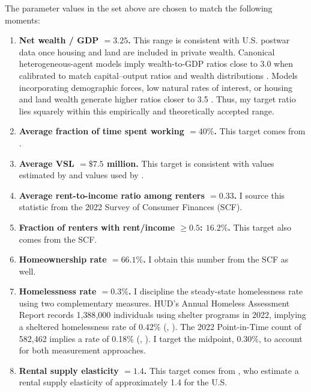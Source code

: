 \documentclass[parskip=full]{article}
\theoremstyle{plain}
\theoremstyle{definition}
\theoremstyle{remark}
\newcommand{\citepshort}[1]{(\citetalias{#1}, \citeyear{#1})}
\begin{document}
The parameter values in the set above are chosen to match the following moments:
\begin{enumerate}
\setlength\itemsep{0.15em}
\item \textbf{Net wealth / GDP $=3.25$.} This range is consistent with U.S. postwar data once housing and land are included in private wealth. Canonical heterogeneous-agent models imply wealth-to-GDP ratios close to 3.0 when calibrated to match capital–output ratios and wealth distributions \citep{krusell_smith_1998,kaplan_moll_violante_2018}. Models incorporating demographic forces, low natural rates of interest, or housing and land wealth generate higher ratios closer to 3.5 \citep{piketty_2014,eggertsson_mehrotra_robbins_2019,rachel_summers_2019,kindermann_krueger_2022}. Thus, my target ratio lies squarely within this empirically and theoretically accepted range.

\item \textbf{Average fraction of time spent working $=40\%$.} This target comes from \citet{gkkoc}.

\item \textbf{Average VSL $=\$7.5$ million.} This target is consistent with values estimated by \citet{viscusi_aldy_2003} and values used by \citet{epa_2010}.

\item \textbf{Average rent-to-income ratio among renters $=0.33$.} I source this statistic from the 2022 Survey of Consumer Finances (SCF).

\item \textbf{Fraction of renters with rent/income $\ge0.5$: $16.2\%$.} This target also comes from the SCF.

\item \textbf{Homeownership rate $=66.1\%$.} I obtain this number from the SCF as well.

\item \textbf{Homelessness rate $=0.3\%$.} I discipline the steady-state homelessness rate using two complementary measures. HUD's Annual Homeless Assessment Report records 1{,}388{,}000 individuals using shelter programs in 2022, implying a sheltered homelessness rate of 0.42\% \citepshort{hud_ahar_2023}. The 2022 Point-in-Time count of 582{,}462 implies a rate of 0.18\% \citepshort{hud_pit_2022}. I target the midpoint, 0.30\%, to account for both measurement approaches.

\item \textbf{Rental supply elasticity $=1.4$.} This target comes from \citet{rotberg_steinberg_2024_mortgage_interest_deductions}, who estimate a rental supply elasticity of approximately 1.4 for the U.S.


\end{enumerate}
\end{document}
